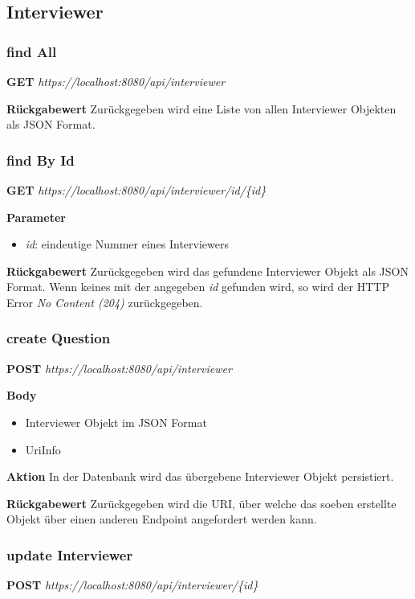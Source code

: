 \subsection{Interviewer}
\subsubsection{find All}
\textbf{GET} \emph{https://localhost:8080/api/interviewer}

\textbf{Rückgabewert}
Zurückgegeben wird eine Liste von allen Interviewer Objekten als JSON
Format.

\subsubsection{find By Id}
\textbf{GET} \emph{https://localhost:8080/api/interviewer/id/\{id\}}

\textbf{Parameter}
\begin{itemize}
    \item \emph{id}: eindeutige Nummer eines Interviewers
\end{itemize}

\textbf{Rückgabewert}
Zurückgegeben wird das gefundene Interviewer Objekt als JSON Format. Wenn keines mit der angegeben \emph{id} gefunden wird, so wird der
HTTP Error \emph{No Content (204)} zurückgegeben.

\subsubsection{create Question}
\textbf{POST} \emph{https://localhost:8080/api/interviewer}

\textbf{Body}
\begin{itemize}
    \item Interviewer Objekt im JSON Format
    \item UriInfo
\end{itemize}

\textbf{Aktion}
In der Datenbank wird das übergebene Interviewer Objekt persistiert.

\textbf{Rückgabewert}
Zurückgegeben wird die URI, über welche das soeben erstellte Objekt über einen anderen Endpoint angefordert werden kann.

\subsubsection{update Interviewer}
\textbf{POST} \emph{https://localhost:8080/api/interviewer/\{id\}}

